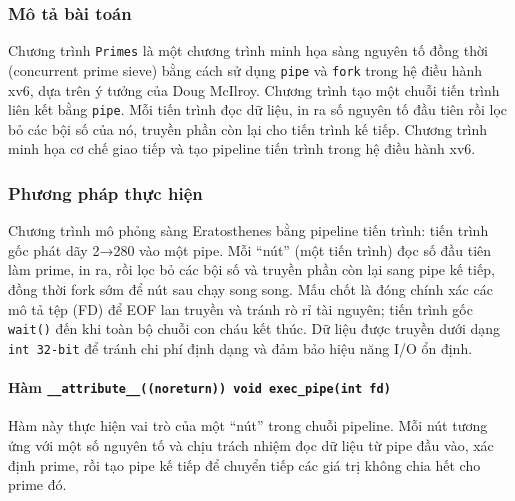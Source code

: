 \subsubsection {Mô tả bài toán}
Chương trình \texttt{Primes} là một chương trình minh họa sàng nguyên tố đồng thời (concurrent prime sieve) bằng cách sử dụng \texttt{pipe} và \texttt{fork} trong hệ điều hành xv6, dựa trên ý tưởng của Doug McIlroy. 
Chương trình tạo một chuỗi tiến trình liên kết bằng \texttt{pipe}. Mỗi tiến trình đọc dữ liệu, in ra số nguyên tố đầu tiên rồi lọc bỏ các bội số của nó, truyền phần còn lại cho tiến trình kế tiếp. 
Chương trình minh họa cơ chế giao tiếp và tạo pipeline tiến trình trong hệ điều hành xv6.

\subsubsection{Phương pháp thực hiện}
Chương trình mô phỏng sàng Eratosthenes bằng pipeline tiến trình: tiến trình gốc phát dãy 2→280 vào một pipe. Mỗi “nút” (một tiến trình) đọc số đầu tiên làm prime, in ra, rồi lọc bỏ các bội số và truyền phần còn lại sang pipe kế tiếp, đồng thời fork sớm để nút sau chạy song song. 
Mấu chốt là đóng chính xác các mô tả tệp (FD) để EOF lan truyền và tránh rò rỉ tài nguyên; tiến trình gốc \texttt{wait()} đến khi toàn bộ chuỗi con cháu kết thúc. 
Dữ liệu được truyền dưới dạng \texttt{int 32-bit} để tránh chi phí định dạng và đảm bảo hiệu năng I/O ổn định.

\paragraph {Hàm \lstinline|__attribute__((noreturn)) void exec_pipe(int fd)|}
Hàm này thực hiện vai trò của một “nút” trong chuỗi pipeline. Mỗi nút tương ứng với một số nguyên tố và chịu trách nhiệm đọc dữ liệu từ pipe đầu vào, xác định prime, rồi tạo pipe kế tiếp để chuyển tiếp các giá trị không chia hết cho prime đó.

